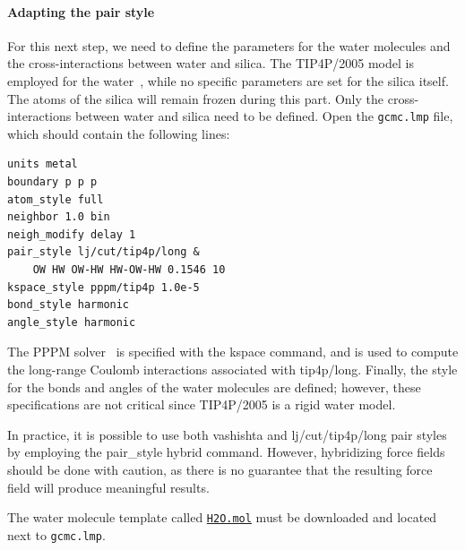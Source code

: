 \documentclass[9pt,tutorial]{livecoms}
\newcommand{\lmpcmd}[1]{\hspace{0pt}\colorbox{listing}{\textcolor{command}{\small{#1}}}\hspace{0pt}} %
\newcommand{\flecmd}[1]{\textcolor{command}{\texttt{#1}}} %
\newcommand{\dwlcmd}[1]{\textcolor{download}{\texttt{#1}}} %
\newcommand{\filepath}{https://raw.githubusercontent.com/lammpstutorials/lammpstutorials-article/main/files/}
\begin{document}
{\color{blue}
\paragraph{Adapting the pair style}

For this next step, we need to define the parameters for the water molecules and
the cross-interactions between water and silica. The TIP4P/2005 model is employed
for the water~\cite{abascal2005general}, while no specific parameters are set
for the silica itself. The atoms of the silica will remain frozen during this part.
Only the cross-interactions between water and silica need
to be defined. Open the \flecmd{gcmc.lmp} file, which should contain the following lines:
\begin{lstlisting}
units metal
boundary p p p
atom_style full
neighbor 1.0 bin
neigh_modify delay 1
pair_style lj/cut/tip4p/long &
    OW HW OW-HW HW-OW-HW 0.1546 10
kspace_style pppm/tip4p 1.0e-5
bond_style harmonic
angle_style harmonic
\end{lstlisting}
The PPPM solver~\cite{luty1996calculating} is specified with the \lmpcmd{kspace}
command, and is used to compute the long-range Coulomb interactions associated
with \lmpcmd{tip4p/long}.  Finally, the style for the bonds
and angles of the water molecules are defined; however, these specifications are
not critical since TIP4P/2005 is a rigid water model.}

\begin{note}
{\color{blue}In practice, it is possible to use both \lmpcmd{vashishta} and
\lmpcmd{lj/cut/tip4p/long} pair styles by employing the \lmpcmd{pair\_style hybrid}
command.  However, hybridizing force fields should be done with caution, as there
is no guarantee that the resulting force field will produce meaningful results.}
\end{note}

The water molecule template called \href{\filepath tutorial6/H2O.mol}{\dwlcmd{H2O.mol}}
must be downloaded and located next to \flecmd{gcmc.lmp}.
\end{document}

